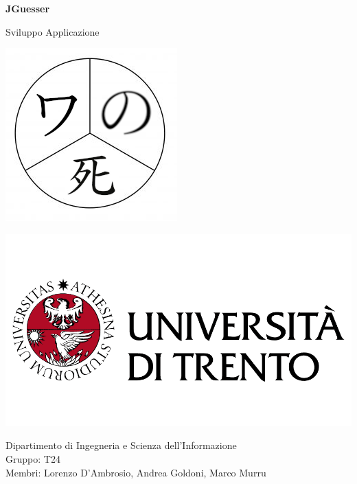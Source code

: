 \documentclass[11pt]{article}
\begin{document}
\begin{titlepage}
		\begin{center}
		    \Huge
			\textbf{JGuesser}
			
			\LARGE
			\vspace{0.85cm}
			Sviluppo Applicazione\\
			\vspace{0.5cm}
			
			\includegraphics[scale=2.5]{images/logo_progetto_se-t24.png}
			
			\vfill
			
		    \includegraphics[scale=0.200]{images/logo_unitn.png}
			
			\Large
			Dipartimento di Ingegneria e Scienza dell’Informazione \\
			Gruppo: T24 \\
			Membri: Lorenzo D'Ambrosio, Andrea Goldoni, Marco Murru
				
			\vspace{1.5cm}
    		
		\end{center}
	\end{titlepage}

\tableofcontents







\end{document}
